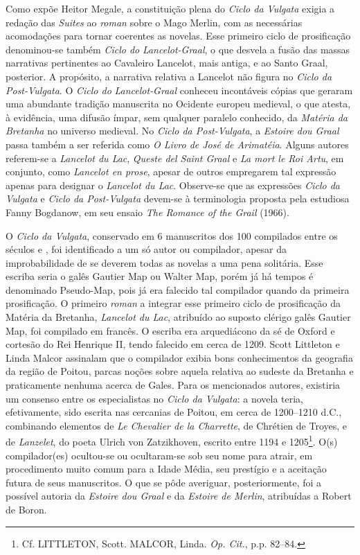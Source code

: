 Como expõe Heitor Megale, a constituição plena do \textit{Ciclo da Vulgata}
exigia a redação das \textit{Suites} ao \textit{roman} sobre o Mago Merlin, com
as necessárias acomodações para tornar coerentes as novelas. Esse primeiro
ciclo de prosificação denominou-se também \textit{Ciclo do}
\textit{Lancelot-Graal}, o que desvela a fusão das massas narrativas
pertinentes ao Cavaleiro Lancelot, mais antiga, e ao Santo Graal, posterior. A
propósito, a narrativa relativa a Lancelot não figura no \textit{Ciclo da
Post-Vulgata}. O \textit{Ciclo do} \textit{Lancelot-Graal} conheceu incontáveis
cópias que geraram uma abundante tradição manuscrita no Ocidente europeu
medieval, o que atesta, à evidência, uma difusão ímpar, sem qualquer paralelo
conhecido, da \textit{Matéria da Bretanha }no universo medieval. No
\textit{Ciclo da Post-Vulgata}, a \textit{Estoire dou Graal} passa também a ser
referida como \textit{O Livro de José de Arimatéia}. Alguns autores referem-se
a \textit{Lancelot du Lac}, \textit{Queste del Saint Graal} e  \textit{La mort
le Roi Artu}, em conjunto, como \textit{Lancelot en prose}, apesar de outros
empregarem tal expressão apenas para designar o \textit{Lancelot du Lac}.
Observe-se que as expressões \textit{Ciclo da Vulgata} e \textit{Ciclo da
Post-Vulgata} devem-se à terminologia proposta pela estudiosa Fanny Bogdanow,
em seu ensaio \textit{The Romance of the Grail }(1966). 

O \textit{Ciclo da Vulgata}, conservado em 6 manuscritos dos 100 compilados
entre os séculos  e , foi identificado a um só autor ou compilador,
apesar da improbabilidade de se deverem todas as novelas a uma pena solitária.
Esse escriba seria o galês Gautier Map ou Walter Map, porém já há tempos é
denominado Pseudo-Map, pois já era falecido tal compilador quando da primeira
prosificação. O primeiro \textit{roman} a integrar esse primeiro ciclo de
prosificação da Matéria da Bretanha, \textit{Lancelot du Lac}, atribuído ao
suposto clérigo galês Gautier Map, foi compilado em francês. O escriba era
arquediácono da sé de Oxford e cortesão do Rei Henrique II, tendo falecido em
cerca de 1209. Scott Littleton e Linda Malcor assinalam que o compilador exibia
bons conhecimentos da geografia da região de Poitou, parcas noções sobre aquela
relativa ao sudeste da Bretanha e praticamente nenhuma acerca de Gales. Para os
mencionados autores, existiria um consenso entre os especialistas no
\textit{Ciclo da Vulgata}: a novela teria, efetivamente, sido escrita nas
cercanias de Poitou, em cerca de 1200--1210 d.C., combinando elementos de
\textit{Le Chevalier de la Charrette}, de Chrétien de Troyes, e de
\textit{Lanzelet}, do poeta Ulrich von Zatzikhoven, escrito entre 1194 e
1205\footnote{ Cf. LITTLETON, Scott. MALCOR, Linda. \textit{Op. Cit.}, p.p.
82--84. }. O(s) compilador(es) ocultou-se ou ocultaram-se sob seu nome para
atrair, em procedimento muito comum para a Idade Média, seu prestígio e a
aceitação futura de seus manuscritos. O que se pôde averiguar, posteriormente,
foi a possível autoria da \textit{Estoire dou Graal} e da \textit{Estoire de
Merlin}, atribuídas a Robert de Boron.

